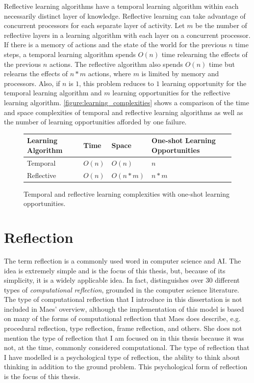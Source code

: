 Reflective learning algorithms have a temporal learning algorithm
within each necessarily distinct layer of knowledge.  Reflective
learning can take advantage of concurrent processors for each separate
layer of activity.  Let $m$ be the number of reflective layers in a
learning algorithm with each layer on a concurrent processor.  If
there is a memory of actions and the state of the world for the
previous $n$ time steps, a temporal learning algorithm spends $O(n)$
time relearning the effects of the previous $n$ actions.  The
reflective algorithm also spends $O(n)$ time but relearns the effects
of $n*m$ actions, where $m$ is limited by memory and processors.
Also, if $n$ is $1$, this problem reduces to $1$ learning opportunity
for the temporal learning algorithm and $m$ learning opportunities for
the reflective learning algorithm.
{\mbox{\autoref{figure:learning_complexities}}} shows a comparison of the time
and space complexities of temporal and reflective learning algorithms
as well as the number of learning opportunities afforded by one
failure.
\begin{figure}
\center
\begin{tabular}{p{2cm}|p{2cm}|p{2cm}|p{3cm}}
Learning Algorithm & Time   & Space    & One-shot Learning Opportunities \\
\hline
Temporal           & $O(n)$ & $O(n)$   & $n$   \\
Reflective         & $O(n)$ & $O(n*m)$ & $n*m$ \\
\end{tabular}
\caption{Temporal and reflective learning complexities with one-shot learning opportunities.}
\label{figure:learning_complexities}
\end{figure}

\section{Reflection}

The term reflection is a commonly used word in computer science and
AI.  The idea is extremely simple and is the focus of this thesis,
but, because of its simplicity, it is a widely applicable idea.  In
fact, \cite{maes:1988} distinguishes over 30 different types of
\emph{computational reflection}, grounded in the computer science
literature.  The type of computational reflection that I introduce in
this dissertation is not included in Maes' overview, although the
implementation of this model is based on many of the forms of
computational reflection that Maes does describe, e.g. procedural
reflection, type reflection, frame reflection, and others.  She does
not mention the type of reflection that I am focused on in this thesis
because it was not, at the time, commonly considered computational.
The type of reflection that I have modelled is a psychological type of
reflection, the ability to think about thinking in addition to the
ground problem.  This psychological form of reflection is the focus of
this thesis.

